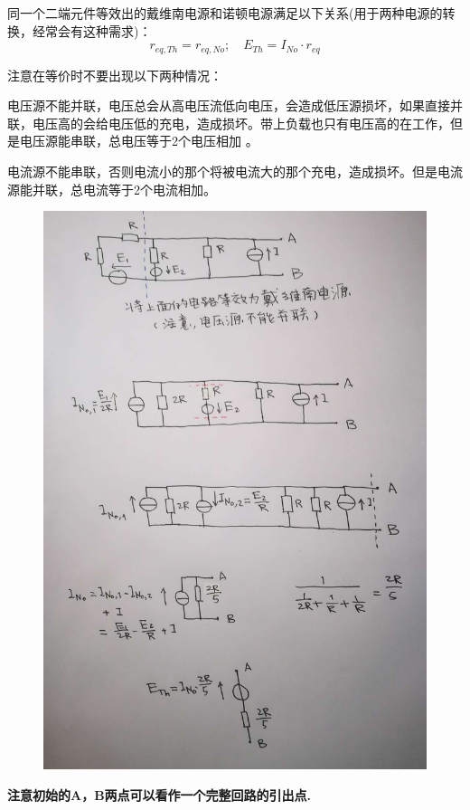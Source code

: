 \documentclass[12pt]{book}
\theoremstyle{definition}\newtheorem{dfn}{Définition}[chapter]
\theoremstyle{plain}\newtheorem{thm}{Théorème}[chapter]
\theoremstyle{plain}\newtheorem{prp}{Proposition}[chapter]
\theoremstyle{plain}\newtheorem{lem}{\bf Lemme}[chapter]
\theoremstyle{plain}\newtheorem{axm}{\bf Axiome}[chapter]
\theoremstyle{plain}\newtheorem{lmm}{\bf Lemme}[chapter]
\theoremstyle{plain}\newtheorem{cor}{\bf Corollaire}[chapter]
\theoremstyle{remark}\newtheorem{rem}{Remarque}[chapter]
\begin{document}
{\color{red} 同一个二端元件等效出的戴维南电源和诺顿电源满足以下关系(用于两种电源的转换，经常会有这种需求)：
$$r_{eq,Th}=r_{eq,No};\quad E_{Th}=I_{No}\cdot r_{eq}$$ } 

注意在等价时不要出现以下两种情况：

{\color{red}电压源不能并联}，电压总会从高电压流低向电压，会造成低压源损坏，如果直接并联，电压高的会给电压低的充电，造成损坏。带上负载也只有电压高的在工作，但是电压源能串联，总电压等于2个电压相加 。

{\color{red}电流源不能串联}，否则电流小的那个将被电流大的那个充电，造成损坏。但是电流源能并联，总电流等于2个电流相加。

\begin{figure}[H]
	\centering
	\includegraphics[scale=0.4]{image//Electrocinetique cadre et concepts de base//3}
\end{figure}
\textbf{注意初始的A，B两点可以看作一个完整回路的引出点.}
\end{document}
